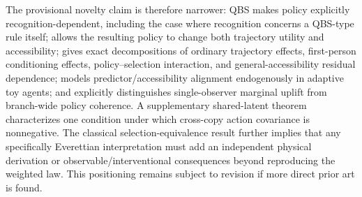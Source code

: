 The provisional novelty claim is therefore narrower: QBS makes policy explicitly recognition-dependent, including the case where recognition concerns a QBS-type rule itself; allows the resulting policy to change both trajectory utility and accessibility; gives exact decompositions of ordinary trajectory effects, first-person conditioning effects, policy--selection interaction, and general-accessibility residual dependence; models predictor/accessibility alignment endogenously in adaptive toy agents; and explicitly distinguishes single-observer marginal uplift from branch-wide policy coherence. A supplementary shared-latent theorem characterizes one condition under which cross-copy action covariance is nonnegative. The classical selection-equivalence result further implies that any specifically Everettian interpretation must add an independent physical derivation or observable/interventional consequences beyond reproducing the weighted law. This positioning remains subject to revision if more direct prior art is found.
